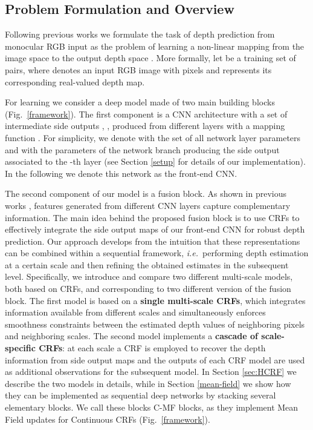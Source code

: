 \documentclass[10pt,twocolumn,letterpaper]{article}
\def\ie{\textit{i.e.}~}
\begin{document}
\subsection{Problem Formulation and Overview}
Following previous works we formulate the task of depth prediction from monocular RGB input as the problem of learning a non-linear mapping 
 from the image space  to the output depth space . More formally, let  be a training set of  pairs, 
where  denotes an input RGB image with  pixels and  represents its corresponding real-valued depth map. 

For learning  we consider a deep model made of two main building blocks (Fig.~\ref{framework}). The first component is a CNN architecture with 
a set of intermediate side outputs , , produced from  different layers 
with a mapping function . 
For simplicity, we denote with  the set of all network layer parameters and with  the parameters of 
the network branch producing the side output associated to the {-th} layer (see Section \ref{setup} for details of our implementation). In the following we denote this network as the front-end CNN.

The second component of our model is a fusion block. As shown in previous works \cite{long2015fully,bertasius2015deepedge,xie2015holistically}, 
features generated from different 
CNN layers capture complementary information. The main idea behind the proposed fusion block
is to use CRFs to effectively integrate the side output maps of our front-end CNN for robust depth prediction. Our approach develops from the intuition that these representations can be combined within a sequential framework, \ie performing depth estimation at a certain scale
and then refining the obtained estimates in the subsequent level.
Specifically, we introduce and compare two different multi-scale models, both based on CRFs, and corresponding to two different version of the
fusion block. The first model is based on a \textbf{single multi-scale CRFs}, which integrates information
available from different scales and simultaneously enforces smoothness constraints between the estimated depth values of
neighboring pixels and neighboring scales. The second model implements a \textbf{cascade of scale-specific CRFs}: at each scale 
a CRF is employed to recover the depth information from side output maps  and the 
outputs of each CRF model are
used as additional observations for the subsequent model.
In Section \ref{sec:HCRF} we describe the two models in details, while in Section \ref{mean-field}
we show how they can be implemented as sequential deep networks by 
stacking several elementary blocks. We call these blocks C-MF blocks, as they implement Mean Field updates for Continuous CRFs (Fig.~\ref{framework}).
\end{document}
